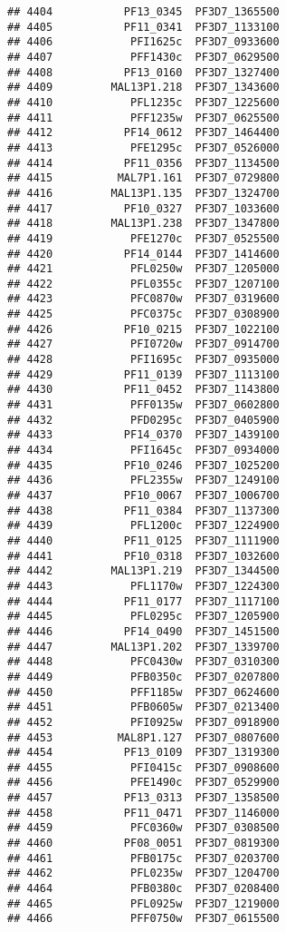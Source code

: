 \documentclass{article}\usepackage[]{graphicx}\usepackage[]{color}
\makeatletter
\newenvironment{kframe}{%
 \def\at@end@of@kframe{}%
 \ifinner\ifhmode%
  \def\at@end@of@kframe{\end{minipage}}%
  \begin{minipage}{\columnwidth}%
 \fi\fi%
 \def\FrameCommand##1{\hskip\@totalleftmargin \hskip-\fboxsep
 \colorbox{shadecolor}{##1}\hskip-\fboxsep
     \hskip-\linewidth \hskip-\@totalleftmargin \hskip\columnwidth}%
 \MakeFramed {\advance\hsize-\width
   \@totalleftmargin\z@ \linewidth\hsize
   \@setminipage}}%
 {\par\unskip\endMakeFramed%
 \at@end@of@kframe}
\newenvironment{knitrout}{}{} %
\makeatother
\begin{document}
\begin{knitrout}
\begin{kframe}
\begin{verbatim}
## 4404           PF13_0345  PF3D7_1365500
## 4405           PF11_0341  PF3D7_1133100
## 4406            PFI1625c  PF3D7_0933600
## 4407            PFF1430c  PF3D7_0629500
## 4408           PF13_0160  PF3D7_1327400
## 4409         MAL13P1.218  PF3D7_1343600
## 4410            PFL1235c  PF3D7_1225600
## 4411            PFF1235w  PF3D7_0625500
## 4412           PF14_0612  PF3D7_1464400
## 4413            PFE1295c  PF3D7_0526000
## 4414           PF11_0356  PF3D7_1134500
## 4415          MAL7P1.161  PF3D7_0729800
## 4416         MAL13P1.135  PF3D7_1324700
## 4417           PF10_0327  PF3D7_1033600
## 4418         MAL13P1.238  PF3D7_1347800
## 4419            PFE1270c  PF3D7_0525500
## 4420           PF14_0144  PF3D7_1414600
## 4421            PFL0250w  PF3D7_1205000
## 4422            PFL0355c  PF3D7_1207100
## 4423            PFC0870w  PF3D7_0319600
## 4425            PFC0375c  PF3D7_0308900
## 4426           PF10_0215  PF3D7_1022100
## 4427            PFI0720w  PF3D7_0914700
## 4428            PFI1695c  PF3D7_0935000
## 4429           PF11_0139  PF3D7_1113100
## 4430           PF11_0452  PF3D7_1143800
## 4431            PFF0135w  PF3D7_0602800
## 4432            PFD0295c  PF3D7_0405900
## 4433           PF14_0370  PF3D7_1439100
## 4434            PFI1645c  PF3D7_0934000
## 4435           PF10_0246  PF3D7_1025200
## 4436            PFL2355w  PF3D7_1249100
## 4437           PF10_0067  PF3D7_1006700
## 4438           PF11_0384  PF3D7_1137300
## 4439            PFL1200c  PF3D7_1224900
## 4440           PF11_0125  PF3D7_1111900
## 4441           PF10_0318  PF3D7_1032600
## 4442         MAL13P1.219  PF3D7_1344500
## 4443            PFL1170w  PF3D7_1224300
## 4444           PF11_0177  PF3D7_1117100
## 4445            PFL0295c  PF3D7_1205900
## 4446           PF14_0490  PF3D7_1451500
## 4447         MAL13P1.202  PF3D7_1339700
## 4448            PFC0430w  PF3D7_0310300
## 4449            PFB0350c  PF3D7_0207800
## 4450            PFF1185w  PF3D7_0624600
## 4451            PFB0605w  PF3D7_0213400
## 4452            PFI0925w  PF3D7_0918900
## 4453          MAL8P1.127  PF3D7_0807600
## 4454           PF13_0109  PF3D7_1319300
## 4455            PFI0415c  PF3D7_0908600
## 4456            PFE1490c  PF3D7_0529900
## 4457           PF13_0313  PF3D7_1358500
## 4458           PF11_0471  PF3D7_1146000
## 4459            PFC0360w  PF3D7_0308500
## 4460           PF08_0051  PF3D7_0819300
## 4461            PFB0175c  PF3D7_0203700
## 4462            PFL0235w  PF3D7_1204700
## 4464            PFB0380c  PF3D7_0208400
## 4465            PFL0925w  PF3D7_1219000
## 4466            PFF0750w  PF3D7_0615500

\end{verbatim}
\end{kframe}
\end{knitrout}
\end{document}
